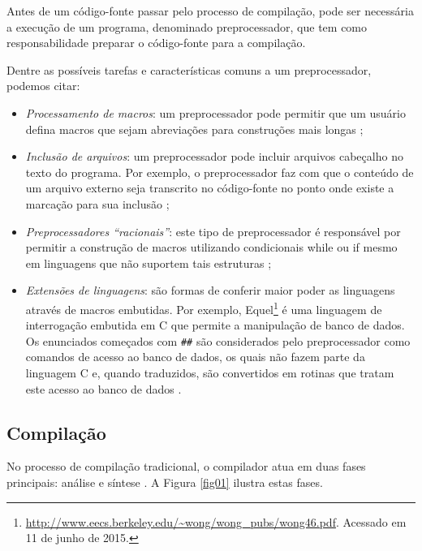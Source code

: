 Antes de um código-fonte passar pelo processo de compilação, pode ser
 necessária a execução de um programa, denominado preprocessador, que
 tem como responsabilidade preparar o código-fonte para a compilação. 

Dentre as possíveis tarefas e características comuns a um preprocessador,
 podemos citar:

\begin{itemize}

\item \textit{Processamento de macros}: um preprocessador pode permitir que um usuário 
    defina macros que sejam abreviações para construções mais longas \cite[pág. 8]{ref3};

\item \textit{Inclusão de arquivos}: um preprocessador pode incluir arquivos cabeçalho no
     texto do programa. Por exemplo, o preprocessador faz com que o conteúdo de
     um arquivo externo seja transcrito no código-fonte no ponto onde existe a 
    marcação para sua inclusão \cite[pág. 8]{ref2};

\item \textit{Preprocessadores “racionais”}: este tipo de preprocessador é responsável 
    por permitir a construção de macros utilizando condicionais while ou if mesmo
     em linguagens que não suportem tais estruturas \cite[pág. 8]{ref2};

\item \textit{Extensões de linguagens}: são formas de conferir maior poder as linguagens
     através de macros embutidas. Por exemplo, 
    Equel\footnote{\url{http://www.eecs.berkeley.edu/~wong/wong\_pubs/wong46.pdf}. Acessado em 11 de junho de 2015.} é uma linguagem de 
    interrogação embutida em C que permite a manipulação de banco de dados. 
    Os enunciados começados com \texttt{\#\#} são considerados pelo preprocessador como
     comandos de acesso ao banco de dados, os quais não fazem parte da 
    linguagem C e, quando traduzidos, são convertidos em rotinas que tratam 
    este acesso ao banco de dados \cite[pág. 8]{ref3}.

\end{itemize}

\subsection{Compilação}

No processo de compilação tradicional, o compilador atua em duas fases 
principais: análise e síntese \cite[pág. 26]{ref6}. A Figura \ref{fig01}
 ilustra estas fases. 

